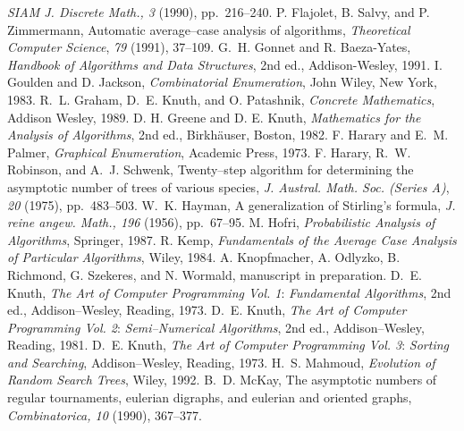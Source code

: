 \begin{thebibliography}{99}
{\em SIAM J. Discrete Math., 3} (1990), pp.~216--240.
P. Flajolet, B. Salvy, and P. Zimmermann,
Automatic average--case analysis of algorithms,
{\em Theoretical Computer Science},
{\em 79} (1991), 37--109.
G.~H. Gonnet and R. Baeza-Yates,
{\em Handbook of Algorithms and Data Structures},
2nd ed., Addison-Wesley, 1991.
I. Goulden and D. Jackson,
{\em Combinatorial Enumeration},
John Wiley, New York, 1983.
R.~L. Graham, D.~E. Knuth, and O. Patashnik,
{\em Concrete Mathematics},
Addison Wesley, 1989.
D. H. Greene and D. E. Knuth,
{\em Mathematics for the Analysis of Algorithms},
2nd ed., Birkh\"{a}user, Boston, 1982.
F. Harary and E.~M. Palmer,
{\em Graphical Enumeration},
Academic Press, 1973.
F. Harary, R.~W. Robinson, and A.~J. Schwenk,
Twenty--step algorithm for determining the asymptotic
number of trees of various species,
{\em J. Austral. Math. Soc. {\rm (Series A)}},
{\em 20} (1975),
pp.~483--503.
W.~K. Hayman,
A generalization of Stirling's formula,
{\em J. reine angew. Math., 196} (1956), pp.~67--95.
M. Hofri,
{\em Probabilistic Analysis of Algorithms},
Springer, 1987.
R. Kemp,
{\em Fundamentals of the Average Case Analysis of Particular Algorithms},
Wiley, 1984.
A. Knopfmacher, A. Odlyzko, B. Richmond, G. Szekeres,
and N. Wormald, manuscript in preparation.
D.~E. Knuth,
{\em The Art of Computer Programming Vol. 1}:
{\em Fundamental Algorithms},
2nd ed., Addison--Wesley, Reading, 1973.
D.~E. Knuth,
{\em The Art of Computer Programming Vol. 2}:
{\em Semi--Numerical Algorithms},
2nd ed.,
Addison--Wesley, Reading, 1981.
D.~E. Knuth,
{\em The Art of Computer Programming Vol. 3}:
{\em Sorting and Searching},
Addison--Wesley, Reading, 1973.
H.~S. Mahmoud,
{\em Evolution of Random Search Trees},
Wiley, 1992.
B.~D. McKay,
The asymptotic numbers of regular tournaments,
eulerian digraphs, and eulerian and oriented graphs,
{\em Combinatorica, 10} (1990), 367--377.

\end{thebibliography}
